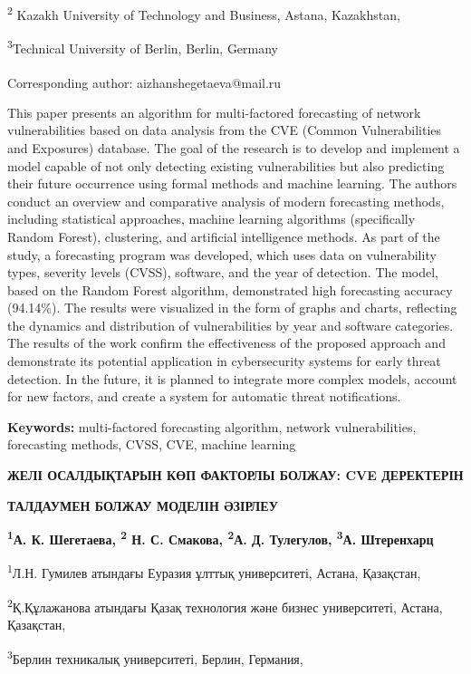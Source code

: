 \textsuperscript{2} Kazakh University of Technology and Business,
Astana, Kazakhstan,

\textsuperscript{3}Technical University of Berlin, Berlin, Germany

\textsuperscript{\envelope } Corresponding author:
aizhanshegetaeva@mail.ru

This paper presents an algorithm for multi-factored forecasting of
network vulnerabilities based on data analysis from the CVE (Common
Vulnerabilities and Exposures) database. The goal of the research is to
develop and implement a model capable of not only detecting existing
vulnerabilities but also predicting their future occurrence using formal
methods and machine learning. The authors conduct an overview and
comparative analysis of modern forecasting methods, including
statistical approaches, machine learning algorithms (specifically Random
Forest), clustering, and artificial intelligence methods. As part of the
study, a forecasting program was developed, which uses data on
vulnerability types, severity levels (CVSS), software, and the year of
detection. The model, based on the Random Forest algorithm, demonstrated
high forecasting accuracy (94.14\%). The results were visualized in the
form of graphs and charts, reflecting the dynamics and distribution of
vulnerabilities by year and software categories. The results of the work
confirm the effectiveness of the proposed approach and demonstrate its
potential application in cybersecurity systems for early threat
detection. In the future, it is planned to integrate more complex
models, account for new factors, and create a system for automatic
threat notifications.

{\bfseries Keywords:} multi-factored forecasting algorithm, network
vulnerabilities, forecasting methods, CVSS, CVE, machine learning

{\bfseries ЖЕЛІ ОСАЛДЫҚТАРЫН КӨП ФАКТОРЛЫ БОЛЖАУ: CVE ДЕРЕКТЕРІН}

{\bfseries ТАЛДАУМЕН БОЛЖАУ МОДЕЛІН ӘЗІРЛЕУ}

{\bfseries \textsuperscript{1}А. К. Шегетаева\textsuperscript{\envelope },
\textsuperscript{2} Н. С. Смакова, \textsuperscript{2}А. Д. Тулегулов,
\textsuperscript{3}А. Штеренхарц}

\textsuperscript{1}Л.Н. Гумилев атындағы Еуразия ұлттық университеті,
Астана, Қазақстан,

\textsuperscript{2}Қ.Құлажанова атындағы Қазақ технология және бизнес
университеті, Астана, Қазақстан,

\textsuperscript{3}Берлин техникалық университеті, Берлин, Германия,


